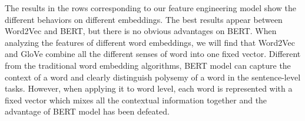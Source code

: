 The results in the rows corresponding to our feature engineering model show the different behaviors on different embeddings.
The best results appear between Word2Vec and BERT, but there is no obvious advantages on BERT.
When analyzing the features of different word embeddings, we will find that Word2Vec and GloVe combine all the different senses of word into one fixed vector. 
Different from the traditional word embedding algorithms, BERT model can capture the context of a word and clearly distinguish polysemy of a word in the sentence-level tasks.
However, when applying it to word level,  each word is represented with a fixed vector which mixes all the contextual information together and the advantage of BERT model has been defeated.

